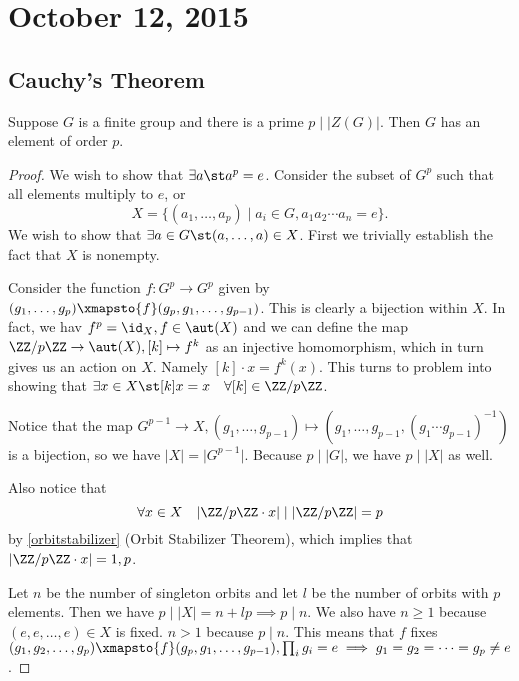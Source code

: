 \section{October 12, 2015}

\subsection{Cauchy's Theorem}

\begin{thm}[Cauchy]
Suppose $G$ is a finite group and there is a prime $p \mid \lvert Z(G)
\vert$. Then $G$ has an element of order $p$.
\end{thm}

\begin{proof}
We wish to show that $\exists a \st a^p = e$. Consider the subset of
$G^p$ such that all elements multiply to $e$, or
\[ X = \lbrace (a_1, \dots, a_p) \mid a_i \in G, a_1 a_2 \cdots a_n = e
\rbrace. \]
We wish to show that $\exists a \in G \st (a, \dots, a) \in X$. First we
trivially establish the fact that $X$ is nonempty.

Consider the function $f : G^p \to G^p$ given by $(g_1, \dots, g_p)
\xmapsto{f} (g_p, g_1, \dots, g_{p - 1})$. This is clearly a bijection
within $X$. In fact, we hav $f^p = \id_X, f \in \aut(X)$ and we can
define the map $\ZZ / p \ZZ \to \aut(X), [k] \mapsto f^k$ as an
injective homomorphism, which in turn gives us an action on $X$. Namely
$[k] \cdot x = f^k(x)$. This turns to problem into showing that $\exists
x \in X \st [k]x = x \quad \forall [k] \in \ZZ / p \ZZ$.

Notice that the map $G^{p - 1} \to X, (g_1, \dots, g_{p - 1}) \mapsto
(g_1, \dots, g_{p - 1}, (g_1 \cdots g_{p - 1})^{-1})$ is a bijection, so
we have $\lvert X \rvert = \lvert G^{p - 1} \rvert$. Because $p \mid
\lvert G \rvert$, we have $p \mid \lvert X \rvert$ as well.

Also notice that
\[ \forall x \in X \quad \lvert \ZZ / p \ZZ \cdot x \rvert \mid \lvert
\ZZ / p \ZZ \rvert = p \]
by \ref{orbitstabilizer} (Orbit Stabilizer Theorem), which implies that
$\lvert \ZZ / p \ZZ \cdot x \rvert = 1, p$.

Let $n$ be the number of singleton orbits and let $l$ be the number of
orbits with $p$ elements. Then we have $p \mid \lvert X \rvert = n + lp
\implies p \mid n$. We also have $n \geq 1$ because $(e, e, \dots, e)
\in X$ is fixed. $n > 1$ because $p \mid n$. This means that $f$ fixes
$(g_1, g_2, \dots, g_p) \xmapsto{f} (g_p, g_1, \dots, g_{p - 1}),
\prod_i g_i = e \implies g_1 = g_2 = \cdots = g_p \neq e$.
\end{proof}

